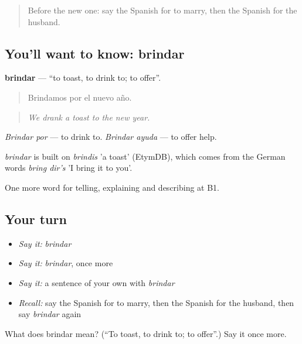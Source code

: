 \begin{quote}
Before the new one: say the Spanish for to marry, then the Spanish for the husband.
\end{quote}

\subsection*{You'll want to know: brindar}
\textbf{brindar} — \textquotedblleft{}to toast, to drink to; to offer\textquotedblright{}.

\begin{quote}
Brindamos por el nuevo año.
\end{quote}

\begin{quote}
\emph{We drank a toast to the new year.}
\end{quote}

\emph{Brindar por} — to drink to. \emph{Brindar ayuda} — to offer help.

\begin{cousinweb}
\emph{brindar} is built on \emph{brindis} 'a toast' (EtymDB), which comes from the German words \emph{bring dir's} 'I bring it to you'.
\end{cousinweb}

\begin{grammarlens}[title={What you've built}]
One more word for telling, explaining and describing at B1.
\end{grammarlens}

\subsection*{Your turn}
\begin{itemize}
\raggedright
  \item \emph{Say it:} \emph{brindar}
  \item \emph{Say it:} \emph{brindar}, once more
  \item \emph{Say it:} a sentence of your own with \emph{brindar}
  \item \emph{Recall:} say the Spanish for to marry, then the Spanish for the husband, then say \emph{brindar} again
\end{itemize}

\begin{tcolorbox}[breakable,colback=teal!4,colframe=teal!35!black,title={Before you move on}]
What does brindar mean? (\textquotedblleft{}To toast, to drink to; to offer\textquotedblright{}.) Say it once more.
\end{tcolorbox}
